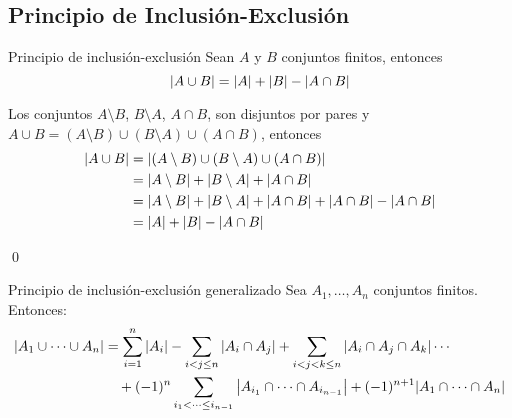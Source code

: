 	\subsection{Principio de Inclusión-Exclusión}
		\begin{theorem}{Principio de inclusión-exclusión}
			Sean $A$ y $B$ conjuntos finitos, entonces
			$$\abs{A\cup B}=\abs{A}+\abs{B}-\abs{A\cap B}$$
		\end{theorem}
		\begin{demostration}{}
			Los conjuntos $A\setminus B$, $B\setminus A$, $A\cap B$, son disjuntos por pares y $A\cup B=(A\setminus B)\cup(B\setminus A)\cup(A\cap B)$, entonces
			\begin{align*}
				\abs{A\cup B}&=\abs{(A\setminus B)\cup(B\setminus A)\cup(A\cap B)} \\
				&=\abs{A\setminus B}+\abs{B\setminus A}+\abs{A\cap B} \\
				&=\abs{A\setminus B}+\abs{B\setminus A}+\abs{A\cap B}+\abs{A\cap B}-\abs{A\cap B} \\
				&=\abs{A}+\abs{B}-\abs{A\cap B}
			\end{align*}
			\begin{flushright}
				\qed
			\end{flushright}
		\end{demostration}
		\begin{theorem}{Principio de inclusión-exclusión generalizado}
			Sea $A_1,\dotso,A_n$ conjuntos finitos. Entonces:
			\begin{align*}
				\abs{A_1\cup\dotsb\cup A_n}&= \sum_{i=1}^{n}{\abs{A_i}}-\sum_{i< j\leq n}{\abs{A_i\cap A_j}}+\sum_{i< j< k\leq n}{\abs{A_i\cap A_j\cap A_k}}\dotsb\\
				&\quad+(-1)^n\sum_{i_1< \dotsb\leq i_{n-1}}{\abs{A_{i_1}\cap\dotsb\cap A_{i_{n-1}}}}+(-1)^{n+1}\abs{A_1\cap\dotsb\cap A_n} \\
			\end{align*}
		\end{theorem}
